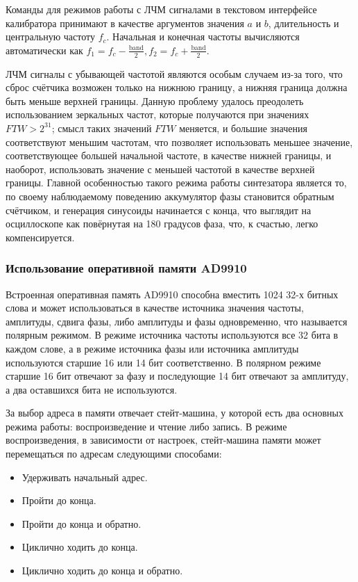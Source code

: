 \documentclass[rusmathsym, eqnumwithinsec, amspack, hyperref]{bomgost}
\begin{document}
Команды для режимов работы с ЛЧМ сигналами в текстовом интерфейсе калибратора принимают в качестве аргументов значения $a$ и $b$, длительность и центральную частоту $f_c$. Начальная и конечная частоты вычисляются автоматически как $f_1 = f_c - \frac{\text{band}}{2}, f_2 = f_c + \frac{\text{band}}{2}$.

ЛЧМ сигналы с убывающей частотой являются особым случаем из-за того, что сброс счётчика возможен только на нижнюю границу, а нижняя граница должна быть меньше верхней границы. Данную проблему удалось преодолеть использованием зеркальных частот, которые получаются при значениях $FTW > 2^{31}$; смысл таких значений $FTW$ меняется, и большие значения соответствуют меньшим частотам, что позволяет использовать меньшее значение, соответствующее большей начальной частоте, в качестве нижней границы, и наоборот, использовать значение с меньшей частотой в качестве верхней границы. Главной особенностью такого режима работы синтезатора является то, по своему наблюдаемому поведению аккумулятор фазы становится обратным счётчиком, и генерация синусоиды начинается с конца, что выглядит на осциллоскопе как повёрнутая на 180 градусов фаза, что, к счастью, легко компенсируется.

\subsubsection{Использование оперативной памяти AD9910}

Встроенная оперативная память AD9910 способна вместить 1024 32-х битных слова и может использоваться в качестве источника значения частоты, амплитуды, сдвига фазы, либо амплитуды и фазы одновременно, что называется полярным режимом. В режиме источника частоты используются все 32 бита в каждом слове, а в режиме источника фазы или источника амплитуды используются старшие 16 или 14 бит соответственно. В полярном режиме старшие 16 бит отвечают за фазу и последующие 14 бит отвечают за амплитуду, а два оставшихся бита не используются.

За выбор адреса в памяти отвечает стейт-машина, у которой есть два основных режима работы: воспроизведение и чтение либо запись. В режиме воспроизведения, в зависимости от настроек, стейт-машина памяти может перемещаться по адресам следующими способами:

\begin{itemize}
	\item Удерживать начальный адрес.
	\item Пройти до конца.
	\item Пройти до конца и обратно.
	\item Циклично ходить до конца.
	\item Циклично ходить до конца и обратно.
\end{itemize}
\end{document}
